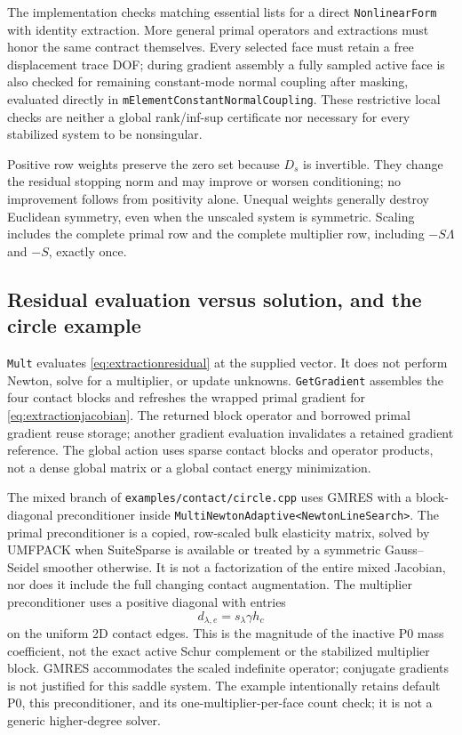 \documentclass[preprint,11pt]{elsarticle}
\numberwithin{equation}{section}
\newcommand{\code}[1]{\texttt{\nolinkurl{#1}}}
\begin{document}
The implementation checks matching essential lists for a direct
\code{NonlinearForm} with identity extraction. More general primal
operators and extractions must honor the same contract themselves.
Every selected face must retain a free displacement trace DOF; during
gradient assembly a fully sampled active face is also checked for remaining
constant-mode normal coupling after masking, evaluated directly in
\code{mElementConstantNormalCoupling}. These restrictive local checks are
neither a global rank/inf-sup certificate nor necessary for every stabilized
system to be nonsingular.

Positive row weights preserve the zero set because $D_s$ is invertible.
They change the residual stopping norm and may improve or worsen
conditioning; no improvement follows from positivity alone. Unequal
weights generally destroy Euclidean symmetry, even when the unscaled
system is symmetric. Scaling includes the complete primal row and the
complete multiplier row, including $-S\Lambda$ and $-S$, exactly once.

\subsection{Residual evaluation versus solution, and the circle example}
\code{Mult} evaluates \eqref{eq:extractionresidual} at the supplied vector.
It does not perform Newton, solve for a multiplier, or update unknowns.
\code{GetGradient} assembles the four contact blocks and refreshes the
wrapped primal gradient for \eqref{eq:extractionjacobian}. The returned
block operator and borrowed primal gradient reuse storage; another gradient
evaluation invalidates a retained gradient reference. The global action
uses sparse contact blocks and operator products, not a dense global
matrix or a global contact energy minimization.

The mixed branch of \code{examples/contact/circle.cpp} uses GMRES with a
block-diagonal preconditioner inside
\code{MultiNewtonAdaptive<NewtonLineSearch>}. The primal preconditioner
is a copied, row-scaled bulk elasticity matrix, solved by UMFPACK when
SuiteSparse is available or treated by a symmetric Gauss--Seidel smoother
otherwise. It is not a factorization of the entire mixed Jacobian, nor
does it include the full changing contact augmentation. The multiplier
preconditioner uses a positive diagonal with entries
\begin{equation}
 d_{\lambda,e}=s_\lambda\gamma h_c
 \label{eq:preconditioner}
\end{equation}
on the uniform 2D contact edges. This is the magnitude of the inactive
P0 mass coefficient, not the exact active Schur complement or the
stabilized multiplier block. GMRES accommodates the scaled indefinite
operator; conjugate gradients is not justified for this saddle system.
The example intentionally retains default P0, this preconditioner, and its
one-multiplier-per-face count check; it is not a generic higher-degree solver.
\end{document}
